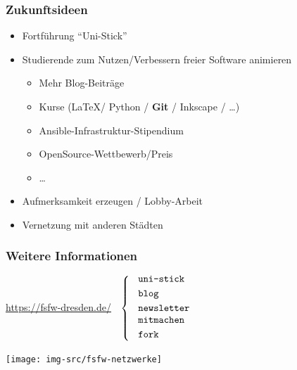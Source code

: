 \documentclass{beamer}
\begin{document}
\begin{frame}[label=ct3]
  \frametitle{Zukunftsideen}

  \begin{itemize}
  \item Fortführung "`Uni-Stick"'
  \item Studierende zum Nutzen/Verbessern freier Software animieren
    \begin{itemize}
    \item Mehr Blog-Beiträge
    \item Kurse (\LaTeX / Python /\textbf{ Git} / Inkscape / \dots)
    \item Ansible-Infrastruktur-Stipendium
    \item OpenSource-Wettbewerb/Preis
    \item \dots
    \end{itemize}

    \bigskip

  \item Aufmerksamkeit erzeugen / Lobby-Arbeit

    \bigskip

  \item Vernetzung mit anderen Städten

  \end{itemize}

\end{frame}


\begin{frame}[label=ct4]
  \frametitle{Weitere Informationen}

  \onslide<+->

  \begin{center}
    \url{https://fsfw-dresden.de/}
    $\;\;\left\{\;\;\text{
        \parbox{2.3cm}{
          \texttt{uni-stick}\\[1mm]
          \texttt{blog}\\[1mm]
          \texttt{newsletter}
          \texttt{mitmachen}\\[1mm]
          \texttt{fork}\\[-3mm]
        }}
    \right.$

    \vspace*{2\bigskipamount}

    \texttt{[image: img-src/fsfw-netzwerke]}
  \end{center}

\end{frame}
\end{document}
